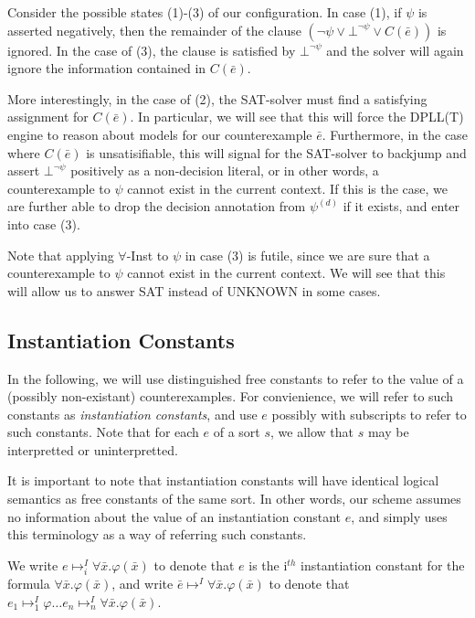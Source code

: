 \documentclass{llncs}
\begin{document}
Consider the possible states (1)-(3) of our configuration.
In case (1), if $\psi$ is asserted negatively, then the remainder of the clause $( \neg \psi \vee \bot^{\neg \psi} \vee C(\bar{e}))$ is ignored.
In the case of (3), the clause is satisfied by $\bot^{\neg \psi}$ and the solver will again ignore the information contained in $C(\bar{e})$.

More interestingly, in the case of (2), the SAT-solver must find a satisfying assignment for $C(\bar{e})$.
In particular, we will see that this will force the DPLL(T) engine to reason about models for our counterexample $\bar{e}$.
Furthermore, in the case where $C(\bar{e})$ is unsatisifiable, this will signal for the SAT-solver to backjump and assert $\bot^{\neg \psi}$ positively as a non-decision literal, or in other words, a counterexample to $\psi$ cannot exist in the current context.
If this is the case, we are further able to drop the decision annotation from $\psi^{(d)}$ if it exists, and enter into case (3).

Note that applying $\forall$-Inst to $\psi$ in case (3) is futile, since we are sure that a counterexample to $\psi$ cannot exist in the current context.
We will see that this will allow us to answer SAT instead of UNKNOWN in some cases.

\subsection{Instantiation Constants}

In the following, we will use distinguished free constants to refer to the value of a (possibly non-existant) counterexamples.
For convienience, we will refer to such constants as \emph{instantiation constants}, and use $e$ possibly with subscripts to refer to such constants.
Note that for each $e$ of a sort $s$, we allow that $s$ may be interpretted or uninterpretted.

It is important to note that instantiation constants will have identical logical semantics as free constants of the same sort.
In other words, our scheme assumes no information about the value of an instantiation constant $e$, and simply uses this terminology as a way of referring such constants.

We write $e \mapsto^I_i \forall \bar{x}. \varphi( \bar{x} )$ to denote that $e$ is the i$^{th}$ instantiation constant for the formula $\forall \bar{x}. \varphi( \bar{x} ) $, and write $\bar{e} \mapsto^I \forall \bar{x}. \varphi( \bar{x} )$ to denote that $e_1 \mapsto^I_1 \varphi \ldots e_n \mapsto^I_n \forall \bar{x}. \varphi( \bar{x} )$.
\end{document}
